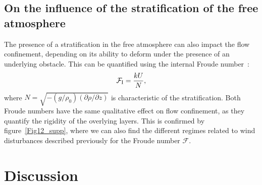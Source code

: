   \subsection{On the influence of the stratification of the free atmosphere}

  The presence of a stratification in the free atmosphere can also impact the flow confinement, depending on its ability to deform under the presence of an underlying obstacle. This can be quantified using the internal Froude number~\citep{Vosper2004, Stull2006, Sheridan2006, Hunt2006, Jiang2014}:
  \begin{equation}
    \mathcal{F}_{\textup{I}} = \displaystyle\frac{k U}{N},
  \end{equation}
  where $N = \sqrt{-(g/\rho_{0})(\partial \rho/\partial z)}$ is characteristic of the stratification. Both Froude numbers have the same qualitative effect on flow confinement, as they quantify the rigidity of the overlying layers. This is confirmed by figure~\ref{Fig12_supp}, where we can also find the different regimes related to wind disturbances described previously for the Froude number $\mathcal{F}$.

\section{Discussion}

